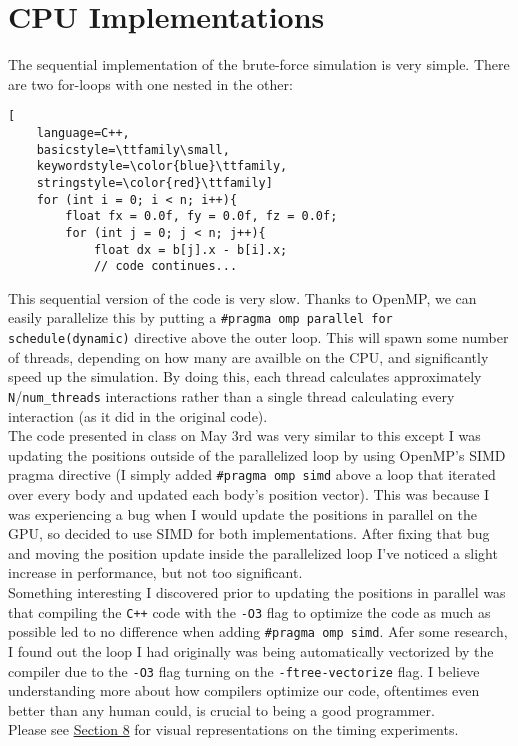 \section{CPU Implementations}
The sequential implementation of the brute-force simulation is very simple. There are two
for-loops with one nested in the other:
\begin{lstlisting}[
    language=C++,
    basicstyle=\ttfamily\small,
    keywordstyle=\color{blue}\ttfamily,
    stringstyle=\color{red}\ttfamily]
    for (int i = 0; i < n; i++){
        float fx = 0.0f, fy = 0.0f, fz = 0.0f;
        for (int j = 0; j < n; j++){
            float dx = b[j].x - b[i].x;
            // code continues...
\end{lstlisting}
This sequential version of the code is very slow. Thanks to OpenMP, 
we can easily parallelize this by putting a \verb|#pragma omp parallel for schedule(dynamic)| directive above the outer loop. 
This will spawn some number of threads, depending on how many are availble on the CPU, and 
significantly speed up the simulation. By doing this, each thread calculates approximately \verb|N|/\verb|num_threads|
interactions rather than a single thread calculating every interaction (as it did in the original code). \\
\indent The code presented in class on May 3rd was very similar to this except I was updating the positions outside of the 
parallelized loop by using OpenMP's SIMD pragma directive (I simply added \verb|#pragma omp simd| above a 
loop that iterated over every body and updated each body's position vector). This was because I was experiencing a bug 
when I would update the positions in parallel on the GPU, so decided to use SIMD for both implementations. After fixing that bug 
and moving the position update inside the parallelized loop
I've noticed a slight increase in performance, but not too significant. \\
\indent Something interesting I discovered prior to updating the positions in parallel 
was that compiling the \verb|C++| code with the \verb|-O3| flag to 
optimize the code as much as possible led to no difference when adding \verb|#pragma omp simd|. 
Afer some research, I found out the loop I had originally was being automatically vectorized by the compiler due to the \verb|-O3| 
flag turning on the \verb|-ftree-vectorize| flag. I believe understanding more about how compilers optimize our 
code, oftentimes even better than any human could, is crucial to being a good programmer.\\
\indent Please see \hyperref[sec:timing]{Section 8} for visual representations on the timing experiments.

